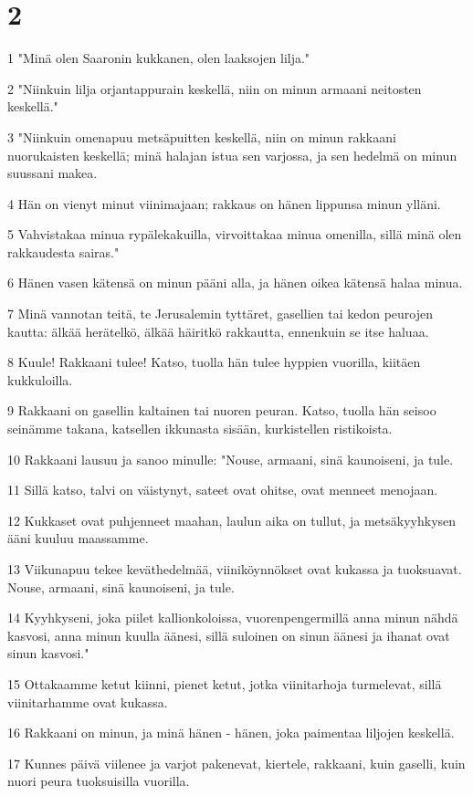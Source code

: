 \chapter{2}

\par 1 "Minä olen Saaronin kukkanen, olen laaksojen lilja."
\par 2 "Niinkuin lilja orjantappurain keskellä, niin on minun armaani neitosten keskellä."
\par 3 "Niinkuin omenapuu metsäpuitten keskellä, niin on minun rakkaani nuorukaisten keskellä; minä halajan istua sen varjossa, ja sen hedelmä on minun suussani makea.
\par 4 Hän on vienyt minut viinimajaan; rakkaus on hänen lippunsa minun ylläni.
\par 5 Vahvistakaa minua rypälekakuilla, virvoittakaa minua omenilla, sillä minä olen rakkaudesta sairas."
\par 6 Hänen vasen kätensä on minun pääni alla, ja hänen oikea kätensä halaa minua.
\par 7 Minä vannotan teitä, te Jerusalemin tyttäret, gasellien tai kedon peurojen kautta: älkää herätelkö, älkää häiritkö rakkautta, ennenkuin se itse haluaa.
\par 8 Kuule! Rakkaani tulee! Katso, tuolla hän tulee hyppien vuorilla, kiitäen kukkuloilla.
\par 9 Rakkaani on gasellin kaltainen tai nuoren peuran. Katso, tuolla hän seisoo seinämme takana, katsellen ikkunasta sisään, kurkistellen ristikoista.
\par 10 Rakkaani lausuu ja sanoo minulle: "Nouse, armaani, sinä kaunoiseni, ja tule.
\par 11 Sillä katso, talvi on väistynyt, sateet ovat ohitse, ovat menneet menojaan.
\par 12 Kukkaset ovat puhjenneet maahan, laulun aika on tullut, ja metsäkyyhkysen ääni kuuluu maassamme.
\par 13 Viikunapuu tekee keväthedelmää, viiniköynnökset ovat kukassa ja tuoksuavat. Nouse, armaani, sinä kaunoiseni, ja tule.
\par 14 Kyyhkyseni, joka piilet kallionkoloissa, vuorenpengermillä anna minun nähdä kasvosi, anna minun kuulla äänesi, sillä suloinen on sinun äänesi ja ihanat ovat sinun kasvosi."
\par 15 Ottakaamme ketut kiinni, pienet ketut, jotka viinitarhoja turmelevat, sillä viinitarhamme ovat kukassa.
\par 16 Rakkaani on minun, ja minä hänen - hänen, joka paimentaa liljojen keskellä.
\par 17 Kunnes päivä viilenee ja varjot pakenevat, kiertele, rakkaani, kuin gaselli, kuin nuori peura tuoksuisilla vuorilla.

